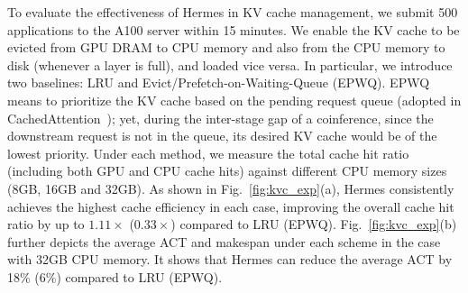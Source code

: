 To evaluate the effectiveness of Hermes in KV cache management, we submit 500 applications to the A100 server within 15 minutes.
We enable the KV cache to be evicted from GPU DRAM to CPU memory and also from the CPU memory to disk (whenever a layer is full), and loaded vice versa. 
In particular, we introduce two baselines: LRU and Evict/Prefetch-on-Waiting-Queue (EPWQ). 
EPWQ means to prioritize the KV cache based on the pending request queue (adopted in CachedAttention~\cite{gao2024cost}); yet, during the inter-stage gap of a coinference, since the downstream request is not in the queue, its desired KV cache would be of the lowest priority.
Under each method, we measure the total cache hit ratio (including both GPU and CPU cache hits) against different CPU memory sizes (8GB, 16GB and 32GB). 
As shown in Fig.~\ref{fig:kvc_exp}(a), Hermes consistently achieves the highest cache efficiency in each case, improving the overall cache hit ratio by up to $1.11\times$ ($0.33\times$) compared to LRU (EPWQ).
Fig.~\ref{fig:kvc_exp}(b) further depicts the average ACT and makespan under each scheme in the case with 32GB CPU memory.
It shows that Hermes can reduce the average ACT by 18\% (6\%) compared to LRU (EPWQ).


